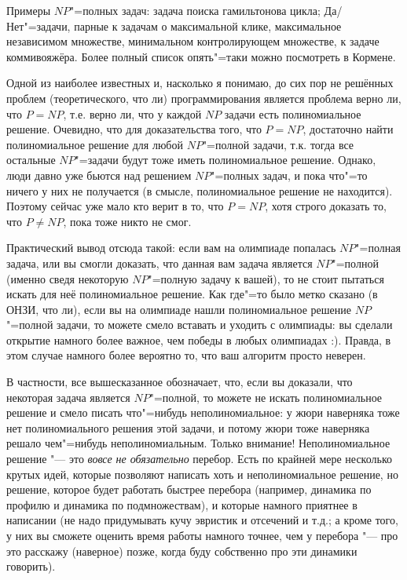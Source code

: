 \documentclass[a4paper,10pt]{problems}
\begin{document}
Примеры $NP$"=полных задач: задача поиска гамильтонова цикла; Да/Нет"=задачи, 
парные к задачам о максимальной клике, максимальное независимом множестве, 
минимальном контролирующем множестве, к задаче коммивояжёра. Более полный 
список опять"=таки можно посмотреть в Кормене.

 Одной из наиболее известных и, 
насколько я понимаю, до сих пор не решённых проблем (теоретического, что ли) программирования 
является проблема верно ли, что $P=NP$, т.е. верно ли, что у каждой $NP$ задачи есть  
полиномиальное решение. Очевидно, что для доказательства того, что $P=NP$, достаточно найти 
полиномиальное решение для любой $NP$"=полной задачи, т.к. тогда все остальные $NP$"=задачи будут 
тоже иметь полиномиальное решение. Однако, люди давно уже бьются над решением $NP$"=полных 
задач, и пока что"=то ничего у них не получается (в смысле, полиномиальное решение не 
находится). Поэтому сейчас уже мало кто верит в то, что $P=NP$, хотя строго доказать то, что 
$P\neq NP$, пока тоже никто не смог.

Практический вывод отсюда такой: если вам на олимпиаде попалась $NP$"=полная задача, или вы 
смогли доказать, что данная вам задача является $NP$"=полной (именно сведя некоторую 
$NP$"=полную задачу к вашей), то не стоит пытаться искать для неё полиномиальное решение. Как 
где"=то было метко сказано (в ОНЗИ, что ли), если вы на олимпиаде нашли полиномиальное решение $NP$"=полной 
задачи, то можете смело вставать и уходить с олимпиады: вы сделали открытие намного более 
важное, чем победы в любых олимпиадах :). Правда, в этом случае намного более вероятно то, что 
ваш алгоритм просто неверен.

В частности, все вышесказанное обозначает, что, если вы доказали, что некоторая задача 
является $NP$"=полной, то можете не искать полиномиальное решение и смело писать что"=нибудь 
неполиномиальное: у жюри наверняка тоже нет полиномиального решения этой задачи, и потому жюри 
тоже наверняка решало чем"=нибудь неполиномиальным. Только внимание! Неполиномиальное решение 
"--- это \textit{вовсе не обязательно} перебор. Есть по крайней мере несколько крутых идей, которые 
позволяют написать хоть и неполиномиальное решение, но решение, которое будет работать быстрее 
перебора (например, динамика по профилю и динамика по подмножествам), и которые намного приятнее 
в написании (не надо придумывать кучу эвристик и отсечений и т.д.; а кроме того, у них вы 
сможете оценить время работы намного точнее, чем у перебора "--- про это расскажу (наверное) 
позже, когда буду собственно про эти динамики говорить).
\end{document}
